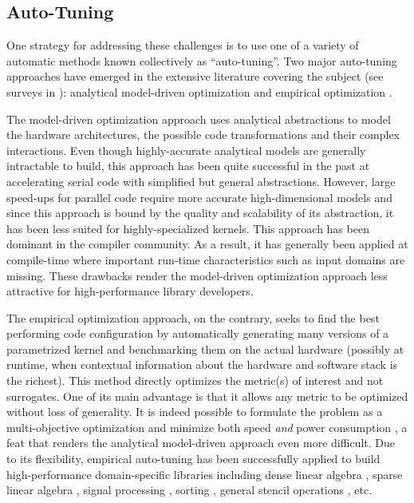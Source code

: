\documentclass{sig-alternate}
\begin{document}
\subsection{Auto-Tuning}


One strategy for addressing these challenges is to use one of a variety of automatic
methods known collectively as ``auto-tuning''. Two major auto-tuning approaches have emerged
in the extensive literature covering the subject (see surveys in
\citep{vuduc2001statistical, demmel2005self, vuduc2005oski, williams2008auto,
datta2008stencil, cavazos2008intelligent, li2009note, park2011evaluation}):
analytical model-driven optimization and empirical optimization
\citep{yotov2003comparison}.


The model-driven optimization approach uses analytical abstractions to model
the hardware architectures, the possible code transformations and their complex
interactions. Even though highly-accurate analytical models are generally
intractable to build, this approach has been quite successful in the past at
accelerating serial code with simplified but general abstractions. However,
large speed-ups for parallel code require more accurate high-dimensional models
and since this approach is bound by the quality and scalability of its
abstraction, it has been less suited for highly-specialized kernels. This
approach has been dominant in the compiler community. As a result, it has
generally been applied at compile-time where important run-time characteristics
such as input domains are missing. These drawbacks render the model-driven
optimization approach less attractive for high-performance library developers.


The empirical optimization approach, on the contrary, seeks to find the best
performing code configuration by automatically generating many versions of a
parametrized kernel and benchmarking them on the actual hardware (possibly at
runtime, when contextual information about the hardware and software stack is
the richest). This method directly optimizes the metric(s) of interest and not
surrogates. One of its main advantage is that it allows any metric to be
optimized without loss of generality. It is indeed possible to formulate the
problem as a multi-objective optimization and minimize both speed \emph{and}
power consumption \citep{rahman2011automated}, a feat that renders the
analytical model-driven approach even more difficult. Due to its flexibility,
empirical auto-tuning has been successfully applied to build high-performance
domain-specific libraries including dense linear algebra
\citep{clint2001automated, bilmes1997optimizing}, sparse linear algebra
\citep{vuduc2005oski}, signal processing \citep{frigo1998fftw}, sorting
\citep{li2004dynamically}, general stencil operations \citep{kamil2010auto}, etc.
\end{document}
